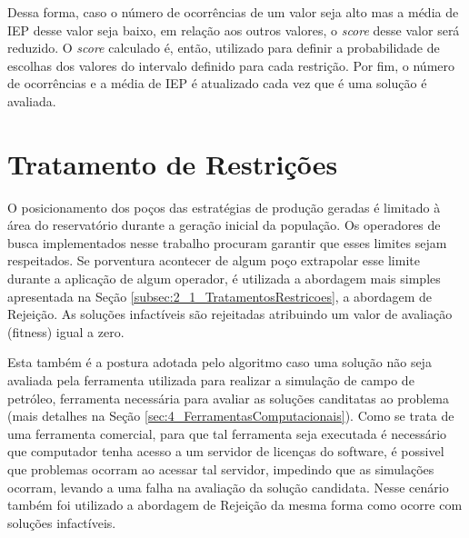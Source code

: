 Dessa forma, caso o número de ocorrências de um valor seja alto mas a média de IEP desse valor seja baixo, em relação aos outros valores, o \textit{score} desse valor será reduzido. O \textit{score} calculado é, então, utilizado para definir a probabilidade de escolhas dos valores do intervalo definido para cada restrição. Por fim, o número de ocorrências e a média de IEP é atualizado cada vez que é uma solução é avaliada.

\section{Tratamento de Restrições}
\label{sec:3_TratamentoRestricoes}
O posicionamento dos poços das estratégias de produção geradas é limitado à área do reservatório durante a geração inicial da população. Os operadores de busca implementados nesse trabalho procuram garantir que esses limites sejam respeitados. Se porventura acontecer de algum poço extrapolar esse limite durante a aplicação de algum operador, é utilizada a abordagem mais simples apresentada na Seção \ref{subsec:2_1_TratamentosRestricoes}, a abordagem de Rejeição. As soluções infactíveis são rejeitadas atribuindo um valor de avaliação (fitness) igual a zero.

 
Esta também é a postura adotada pelo algoritmo caso uma solução não seja avaliada pela ferramenta utilizada para realizar a simulação de campo de petróleo, ferramenta necessária para avaliar as soluções canditatas ao problema (mais detalhes na Seção \ref{sec:4_FerramentasComputacionais}). Como se trata de uma ferramenta comercial, para que tal ferramenta seja executada é necessário que computador tenha acesso a um servidor de licenças do software, é possivel que problemas ocorram ao acessar tal servidor, impedindo que as simulações ocorram, levando a uma falha na avaliação da solução candidata. Nesse cenário também foi utilizado a abordagem de Rejeição da mesma forma como ocorre com soluções infactíveis.